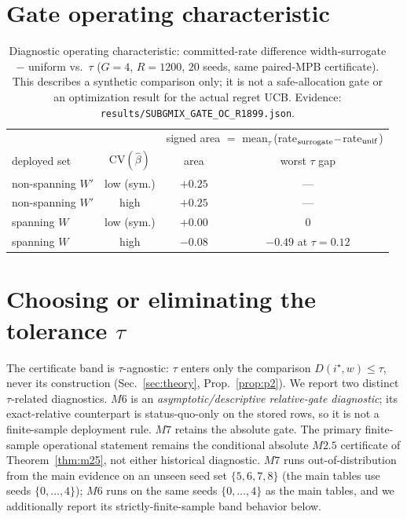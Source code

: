 \documentclass{article}
\begin{document}
\section{Gate operating characteristic}
\label{app:gateoc}
\begin{table}[h]
\centering\small\setlength{\tabcolsep}{4pt}
\begin{tabular}{lccc}
\toprule
& & \multicolumn{2}{c}{signed area $=$ mean$_\tau$\,(rate$_{\rm surrogate}-$rate$_{\rm unif}$)} \\
deployed set & $\mathrm{CV}(\hat\beta)$ & area & worst $\tau$ gap \\
\midrule
non-spanning $W'$ & low (sym.) & $+0.25$ & --- \\
non-spanning $W'$ & high & $+0.25$ & --- \\
spanning $W$ & low (sym.) & $+0.00$ & $0$ \\
spanning $W$ & high & $-0.08$ & $-0.49$ at $\tau{=}0.12$ \\
\bottomrule
\end{tabular}
\caption{Diagnostic operating characteristic: committed-rate difference width-surrogate $-$
uniform vs.\ $\tau$ ($G{=}4$, $R{=}1200$, $20$ seeds, same paired-MPB certificate). This
describes a synthetic comparison only; it is not a safe-allocation gate or an optimization
result for the actual regret UCB. Evidence:
\texttt{results/SUBGMIX\_GATE\_OC\_R1899.json}.}
\label{tab:gateoc}
\end{table}

\section{Choosing or eliminating the tolerance $\tau$}
\label{app:tau}
The certificate band is $\tau$-agnostic: $\tau$ enters only the comparison
$D(i^\star,w)\le\tau$, never its construction (Sec.~\ref{sec:theory}, Prop.~\ref{prop:p2}).
We report two distinct $\tau$-related diagnostics. $M6$ is an
\emph{asymptotic/descriptive relative-gate diagnostic}; its exact-relative counterpart is
status-quo-only on the stored rows, so it is not a finite-sample deployment rule. $M7$ retains
the absolute gate. The primary finite-sample operational statement remains the conditional
absolute $M2.5$ certificate of Theorem~\ref{thm:m25}, not either historical diagnostic.
$M7$ runs out-of-distribution from the main evidence on an unseen seed set
$\{5,6,7,8\}$ (the main tables use seeds $\{0,\dots,4\}$); $M6$ runs on the same seeds
$\{0,\dots,4\}$ as the main tables, and we additionally report its strictly-finite-sample
band behavior below.
\end{document}
